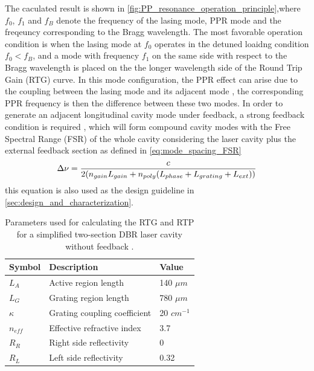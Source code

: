 The caculated result is shown in \autoref{fig:PP_resonance_operation_principle},where $f_0$, $f_1$ and $f_B$ denote the frequency of the lasing mode, PPR mode and the freqeuncy corresponding to the Bragg wavelength. The most favorable operation condition is when the lasing mode at $f_0$ operates in the detuned loaidng condition $f_0<f_B$, and a mode with frequency $f_1$ on the same side with respect to the Bragg wavelength is placed on the the longer wavelength side of the Round Trip Gain (RTG) curve. In this mode configuration, the PPR effect can arise due to the coupling between the lasing mode and its adjacent mode \cite{montrosset2014laser}, the corresponding PPR frequency is then the difference between these two modes. In order to generate an adjacent longitudinal cavity mode under feedback, a strong feedback condition is required \cite{}, which will form compound cavity modes with the Free Spectral Range (FSR) of the whole cavity considering the laser cavity plus the external feedback section as defined in \autoref{eq:mode_spacing_FSR} \cite{coldren2012diode}
\begin{equation}
    \Delta\nu=\frac{c}{2\qty(n_{gain}L_{gain}+n_{poly}\qty(L_{phase}+L_{grating}+L_{ext}))}
    \label{eq:mode_spacing_FSR}
\end{equation}
this equation is also used as the design guideline in \autoref{sec:design_and_characterization}.

\begin{table}[ht]
    \centering
    \caption{Parameters used for calculating the RTG and RTP for a simplified two-section DBR laser cavity without feedback \cite{montrosset2014laser}.}
    \label{tab:PP_resonance_operation_principle}
    \begin{tabular}{@{}lll@{}}
    \toprule
    Symbol    & Description                  & Value        \\ \midrule
    $L_A$     & Active region length         & 140 $\mu m$  \\
    $L_G$     & Grating region length        & 780 $\mu m$  \\
    $\kappa$  & Grating coupling coefficient & 20 $cm^{-1}$ \\
    $n_{eff}$ & Effective refractive index   & 3.7          \\
    $R_R$     & Right side reflectivity      & 0            \\
    $R_L$     & Left side reflectivity       & 0.32         \\ \bottomrule
    \end{tabular}
\end{table}

